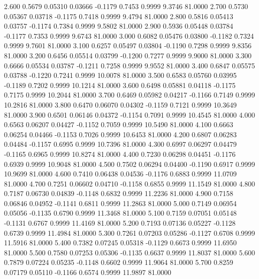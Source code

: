    2.600   0.5679   0.05310   0.03666  -0.1179   0.7453   0.9999   9.3746  81.0000
   2.700   0.5730   0.05367   0.03718  -0.1175   0.7418   0.9999   9.4794  81.0000
   2.800   0.5816   0.05413   0.03757  -0.1174   0.7384   0.9999   9.5802  81.0000
   2.900   0.5936   0.05448   0.03784  -0.1177   0.7353   0.9999   9.6743  81.0000
   3.000   0.6082   0.05476   0.03800  -0.1182   0.7324   0.9999   9.7601  81.0000
   3.100   0.6257   0.05497   0.03804  -0.1190   0.7298   0.9999   9.8356  81.0000
   3.200   0.6456   0.05514   0.03799  -0.1200   0.7277   0.9999   9.9000  81.0000
   3.300   0.6666   0.05534   0.03787  -0.1211   0.7258   0.9999   9.9552  81.0000
   3.400   0.6847   0.05575   0.03788  -0.1220   0.7241   0.9999  10.0078  81.0000
   3.500   0.6583   0.05760   0.03995  -0.1189   0.7202   0.9999  10.1214  81.0000
   3.600   0.6498   0.05881   0.04118  -0.1175   0.7175   0.9999  10.2044  81.0000
   3.700   0.6469   0.05982   0.04217  -0.1166   0.7149   0.9999  10.2816  81.0000
   3.800   0.6470   0.06070   0.04302  -0.1159   0.7121   0.9999  10.3649  81.0000
   3.900   0.6501   0.06146   0.04372  -0.1154   0.7091   0.9999  10.4545  81.0000
   4.000   0.6563   0.06207   0.04427  -0.1152   0.7059   0.9999  10.5490  81.0000
   4.100   0.6663   0.06254   0.04466  -0.1153   0.7026   0.9999  10.6453  81.0000
   4.200   0.6807   0.06283   0.04484  -0.1157   0.6995   0.9999  10.7396  81.0000
   4.300   0.6997   0.06297   0.04479  -0.1165   0.6965   0.9999  10.8274  81.0000
   4.400   0.7230   0.06298   0.04451  -0.1176   0.6939   0.9999  10.9048  81.0000
   4.500   0.7502   0.06294   0.04400  -0.1190   0.6917   0.9999  10.9699  81.0000
   4.600   0.7410   0.06438   0.04536  -0.1176   0.6883   0.9999  11.0709  81.0000
   4.700   0.7251   0.06602   0.04710  -0.1158   0.6855   0.9999  11.1549  81.0000
   4.800   0.7187   0.06730   0.04839  -0.1148   0.6832   0.9999  11.2236  81.0000
   4.900   0.7158   0.06846   0.04952  -0.1141   0.6811   0.9999  11.2863  81.0000
   5.000   0.7149   0.06954   0.05056  -0.1135   0.6790   0.9999  11.3468  81.0000
   5.100   0.7159   0.07051   0.05148  -0.1131   0.6767   0.9999  11.4169  81.0000
   5.200   0.7193   0.07136   0.05227  -0.1128   0.6739   0.9999  11.4984  81.0000
   5.300   0.7261   0.07203   0.05286  -0.1127   0.6708   0.9999  11.5916  81.0000
   5.400   0.7382   0.07245   0.05318  -0.1129   0.6673   0.9999  11.6950  81.0000
   5.500   0.7580   0.07253   0.05306  -0.1135   0.6637   0.9999  11.8037  81.0000
   5.600   0.7879   0.07224   0.05235  -0.1148   0.6602   0.9999  11.9064  81.0000
   5.700   0.8259   0.07179   0.05110  -0.1166   0.6574   0.9999  11.9897  81.0000
